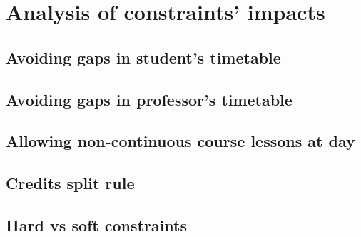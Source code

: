 \chapter{Analysis of constraints' impacts}
\label{chap:constranalysis}


\section{Avoiding gaps in student's timetable}



\section{Avoiding gaps in professor's timetable}



\section{Allowing non-continuous course lessons at day}



\section{Credits split rule}



\section{Hard vs soft constraints}
